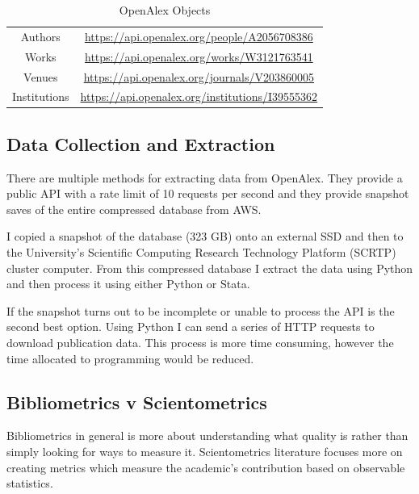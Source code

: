 \documentclass[10pt]{report}
\begin{document}
\begin{table}[htbp]
    \centering
    \begin{tabular}{c|c}
         Authors & \hyperlink{https://api.openalex.org/people/A2056708386}{https://api.openalex.org/people/A2056708386} \\
         Works &  \hyperlink{https://api.openalex.org/works/W3121763541}{https://api.openalex.org/works/W3121763541} \\
         Venues & \hyperlink{https://api.openalex.org/journals/V203860005}{https://api.openalex.org/journals/V203860005} \\
         Institutions & \hyperlink{https://api.openalex.org/institutions/I39555362}{https://api.openalex.org/institutions/I39555362} \\
         
    \end{tabular}
    \caption{OpenAlex Objects}
    \label{tab:openalex}
\end{table}

\subsection*{Data Collection and Extraction}

There are multiple methods for extracting data from OpenAlex. They provide a public API with a rate limit of 10 requests per second and they provide snapshot saves of the entire compressed database from AWS.

I copied a snapshot of the database (323 GB) onto an external SSD and then to the University's Scientific Computing Research Technology Platform (SCRTP) cluster computer. From this compressed database I extract the data using Python and then process it using either Python or Stata.

If the snapshot turns out to be incomplete or unable to process the API is the second best option. Using Python I can send a series of HTTP requests to download publication data. This process is more time consuming, however the time allocated to programming would be reduced.

\subsection*{Bibliometrics v Scientometrics}
\label{ssec:bibvscient}

Bibliometrics in general is more about understanding what quality is rather than simply looking for ways to measure it. Scientometrics literature focuses more on creating metrics which measure the academic's contribution based on observable statistics.
\end{document}
